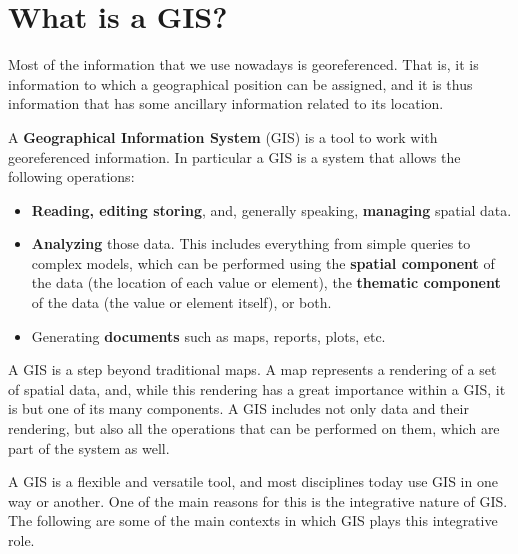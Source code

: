
\chapter{What is a GIS?}

\pagestyle{fancy}

Most of the information that we use nowadays is georeferenced. That is, it is information to which a geographical position can be assigned, and it is thus information that has some ancillary information related to its location.

A \textbf{Geographical Information System} (GIS) is a tool to work with georeferenced information. In particular a GIS is a system that allows the following operations:

\begin{itemize}
	\item \textbf{Reading, editing storing}, and, generally speaking, \textbf{managing} spatial data.
	\item \textbf{Analyzing} those data. This includes everything from simple queries to complex models, which can be performed using the \textbf{spatial component} of the data (the location of each value or element), the \textbf{thematic component} of the data (the value or element itself), or both.
	\item Generating \textbf{documents} such as maps, reports, plots, etc.
\end{itemize}


A GIS is a step beyond traditional maps. A map represents a rendering of a set of spatial data, and, while this rendering has a great importance within a GIS, it is but one of its many components. A GIS includes not only data and their rendering, but also all the operations that can be performed on them, which are part of the system as well.

A GIS is a flexible and versatile tool, and most disciplines today use GIS in one way or another. One of the main reasons for this is the integrative nature of GIS. The following are some of the main contexts in which GIS plays this integrative role.



